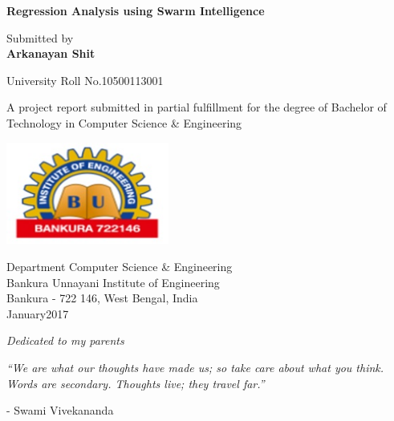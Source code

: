 \documentclass[11pt, a4paper]{report}
\newcommand{\ProjectTitle}{Regression Analysis using Swarm Intelligence}
\newcommand{\AuthorName}{Arkanayan Shit}
\begin{document}
\begin{titlepage}
    \begin{center}
        \vspace*{0.01cm}
        \huge
        \textbf{\ProjectTitle}
        
        
        \vspace{1.5cm}
        
        Submitted by\\
        \textbf{\AuthorName}
         
         University Roll No.10500113001         
        
        \vfill
        
        A project report  submitted in partial fulfillment for the degree of
       Bachelor of Technology in Computer Science \& Engineering
        
        \vspace{0.8cm}
        
        \includegraphics[width=0.4\textwidth]{buie_logo.jpg}
        
        Department Computer Science \& Engineering\\
        Bankura Unnayani Institute of Engineering\\
        Bankura - 722 146, West Bengal, India\\
       
       {January}{\hspace*{0.5cm}}{2017}
        
    \end{center}
\end{titlepage}
\newpage


\begin{center}
\vspace*{8.5cm}
\LARGE
\textit{Dedicated to my parents}

\end{center}



\newpage
{\it ``We are what our thoughts have made us; so take care about what you think. Words are secondary. Thoughts live; they travel far.''}
\begin{flushright}
- Swami Vivekananda
\end{flushright}
\end{document}
